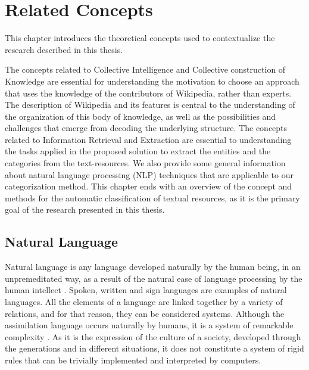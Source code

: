 \chapter{\hspace*{3pt} Related Concepts}
\label{chapter:related-concepts}



This chapter introduces the theoretical concepts used to contextualize the research described in this thesis.

The concepts related to Collective Intelligence and Collective construction of Knowledge are essential for understanding the motivation to choose an approach that uses the knowledge of the contributors of Wikipedia, rather than experts. The description of Wikipedia and its features is central to the understanding of the organization of this body of knowledge, as well as the possibilities and challenges that emerge from decoding  the underlying structure. 
The concepts related to Information Retrieval and Extraction are essential to understanding the tasks applied in the proposed solution to extract the entities and the categories from the text-resources.
We also provide some general information about natural language processing (NLP) techniques that are applicable to our categorization method. 
This chapter ends with an overview of the concept and methods for the automatic classification of textual resources, as it is the primary goal of the research presented in this thesis. 

\section{\hspace*{3pt}Natural Language}

Natural language is any language developed naturally by the human being, in an unpremeditated way, as a result of the natural ease of language processing by the human intellect \cite{chomsky1975logical}. Spoken, written and sign languages are examples of natural languages. 
All the elements of a language are linked together by a variety of relations, and for that reason, they can be considered systems. Although the assimilation language occurs naturally by humans, it is a system of remarkable complexity \cite{chomsky1975logical}. 
As it is the expression of the culture of a society, developed through the generations and in different situations, it does not constitute a system of rigid rules that can be trivially implemented and interpreted by computers.


